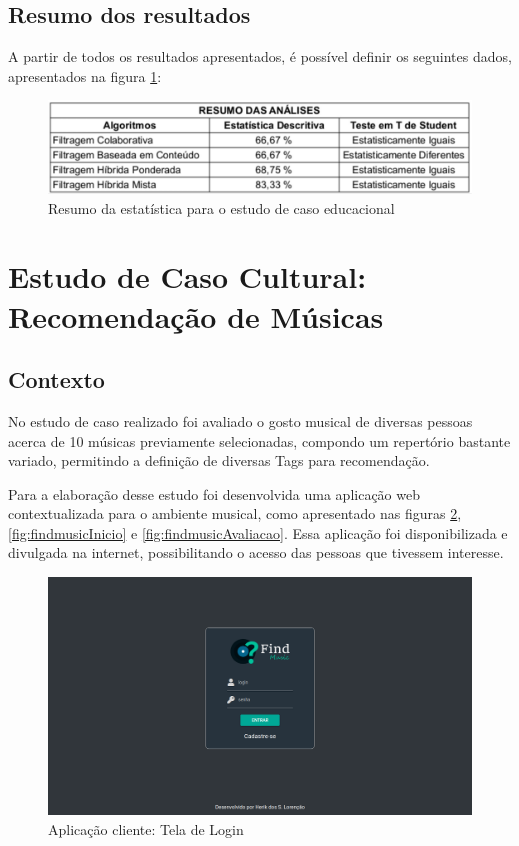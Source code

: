 \subsection{Resumo dos resultados}

A partir de todos os resultados apresentados, é possível definir os seguintes dados, apresentados na figura \ref{fig:resumoEstatisticaEducacional}:

\begin{figure}[H]
	\centering
	\includegraphics[width=.8\linewidth]{imagens/resumoEstatisticaEducacional.jpg}
	\caption[Resumo da estatística para o estudo de caso educacional]{Resumo da estatística para o estudo de caso educacional}
    \label{fig:resumoEstatisticaEducacional}
\end{figure}

\section{Estudo de Caso Cultural: Recomendação de Músicas}

\subsection{Contexto}

No estudo de caso realizado foi avaliado o gosto musical de diversas pessoas acerca de 10 músicas previamente selecionadas, compondo um repertório bastante variado, permitindo a definição de diversas Tags para recomendação.

Para a elaboração desse estudo foi desenvolvida uma aplicação web contextualizada para o ambiente musical, como apresentado nas figuras \ref{fig:findmusicLogin}, \ref{fig:findmusicInicio} e \ref{fig:findmusicAvaliacao}. Essa aplicação foi disponibilizada e divulgada na internet, possibilitando o acesso das pessoas que tivessem interesse.

\begin{figure}[H]
	\centering
	\includegraphics[width=.7\linewidth]{imagens/findmusicLogin.png}
	\caption[Aplicação cliente: Tela de Login]{Aplicação cliente: Tela de Login}
    \label{fig:findmusicLogin}
\end{figure}

